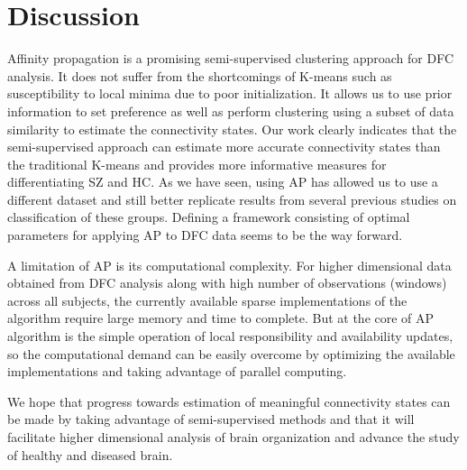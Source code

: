 \documentclass{article}
\begin{document}
\section{Discussion}
\label{sec:Discussion}

Affinity propagation is a promising semi-supervised clustering approach for \ac{DFC} analysis. It does not suffer from the shortcomings of K-means such as susceptibility to local minima due to poor initialization. It allows us to use prior information to set preference as well as perform clustering using a subset of data similarity to estimate the connectivity states. Our work clearly indicates that the semi-supervised approach can estimate more accurate connectivity states than the traditional K-means and provides more informative measures for differentiating \ac{SZ} and \ac{HC}. As we have seen, using \ac{AP} has allowed us to use a different dataset and still better replicate results from several previous studies on classification of these groups. Defining a framework consisting of optimal parameters for applying \ac{AP} to \ac{DFC} data seems to be the way forward.

A limitation of \ac{AP} is its computational complexity. For higher dimensional data obtained from \ac{DFC} analysis along with high number of observations (windows) across all subjects, the currently available sparse implementations of the algorithm require large memory and time to complete. But at the core of \ac{AP} algorithm is the simple operation of local responsibility and availability updates, so the computational demand can be easily overcome by optimizing the available implementations and taking advantage of parallel computing.

We hope that progress towards estimation of meaningful connectivity states can be made by taking advantage of semi-supervised methods and that it will facilitate higher dimensional analysis of brain organization and advance the study of healthy and diseased brain.

\vfill\pagebreak



\end{document}
